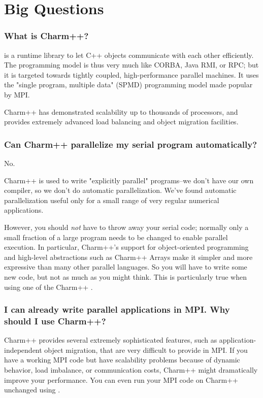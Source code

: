 \section{Big Questions}

\subsubsection{What is Charm++?}

 is
a runtime library to let C++ objects communicate with each other efficiently.
The programming model is thus very much like CORBA, Java RMI, or RPC; but
it is targeted towards tightly coupled, high-performance parallel machines.
It uses the "single program, multiple data" (SPMD) programming model made
popular by MPI.

Charm++ has demonstrated scalability up to thousands of processors,
and provides extremely advanced load balancing and object migration facilities.

\subsubsection{Can Charm++ parallelize my serial program automatically?}

No.

Charm++ is used to write "explicitly parallel" programs--we don't have
our own compiler, so we don't do automatic parallelization. We've found
automatic parallelization useful only for a small range of very regular
numerical applications.

However, you should { \em not} have to throw away your serial code;
normally only a small fraction of a large program needs to be changed to
enable parallel execution. In particular, Charm++'s support for object-oriented
programming and high-level abstractions such as Charm++ Arrays make it
simpler and more expressive than many other parallel languages. So you
will have to write some new code, but not as much as you might think. This
is particularly true when using one of the Charm++ .

\subsubsection{I can already write parallel applications in MPI. Why should I use Charm++?}

Charm++ provides several extremely sophisticated features, such as
application-independent object migration, that are very difficult to provide
in MPI. If you have a working MPI code but have scalability problems
because of dynamic behavior, load imbalance, or communication costs, Charm++
might dramatically improve your performance. You can even run your
MPI code on Charm++ unchanged using .

